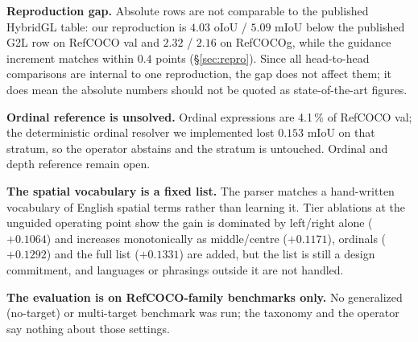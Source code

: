 \textbf{Reproduction gap.} Absolute rows are not comparable to the published
HybridGL table: our reproduction is $4.03$ oIoU / $5.09$ mIoU below the
published G2L row on RefCOCO val and $2.32$ / $2.16$ on RefCOCOg, while the
guidance increment matches within $0.4$ points (§\ref{sec:repro}). Since all
head-to-head comparisons are internal to one reproduction, the gap does not
affect them; it does mean the absolute numbers should not be quoted as
state-of-the-art figures.

\textbf{Ordinal reference is unsolved.} Ordinal expressions are 4.1\,\% of
RefCOCO val; the deterministic ordinal resolver we implemented lost
$0.153$ mIoU on that stratum, so the operator abstains and the stratum is
untouched. Ordinal and depth reference remain open.

\textbf{The spatial vocabulary is a fixed list.} The parser matches a
hand-written vocabulary of English spatial terms rather than learning it. Tier
ablations at the unguided operating point show the gain is dominated by
left/right alone ($+0.1064$) and increases monotonically as middle/centre
($+0.1171$), ordinals ($+0.1292$) and the full list ($+0.1331$) are added, but
the list is still a design commitment, and languages or phrasings outside it
are not handled.

\textbf{The evaluation is on RefCOCO-family benchmarks only.} No generalized
(no-target) or multi-target benchmark was run; the taxonomy and the operator
say nothing about those settings.
